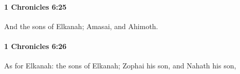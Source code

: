 		\paragraph{1 Chronicles 6:25} %
			\label{1CHRONICLES-6-25}

			And the sons of Elkanah; Amasai, and Ahimoth.


		\paragraph{1 Chronicles 6:26} %
			\label{1CHRONICLES-6-26}

			As for Elkanah: the sons of Elkanah; Zophai his son, and Nahath his son,


